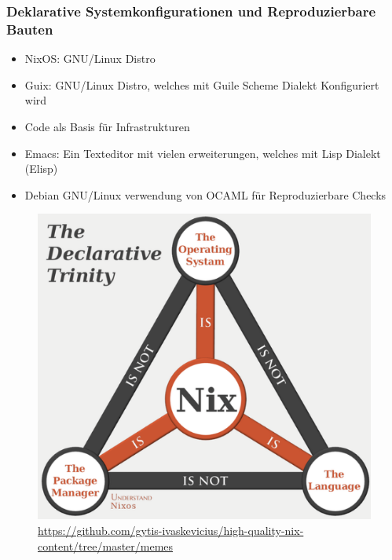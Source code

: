 \documentclass{beamer}
\begin{document}
\begin{frame}
\frametitle{Deklarative Systemkonfigurationen und Reproduzierbare Bauten}
 \begin{itemize}
		\item NixOS: GNU/Linux Distro 
		\item Guix: GNU/Linux Distro, welches mit Guile Scheme Dialekt Konfiguriert wird
		\item Code als Basis für Infrastrukturen
		\item Emacs: Ein Texteditor mit vielen erweiterungen, welches mit Lisp Dialekt (Elisp)
		\item Debian GNU/Linux verwendung von OCAML für Reproduzierbare Checks
\end{itemize}

\end{frame}

\begin{frame}
    \begin{figure}
    \centering
    \includegraphics[width=0.7\linewidth]{bilder/nix.png}
    \textmd{\tiny \url{https://github.com/gytis-ivaskevicius/high-quality-nix-content/tree/master/memes} }
\end{figure}

\end{frame}
\end{document}
